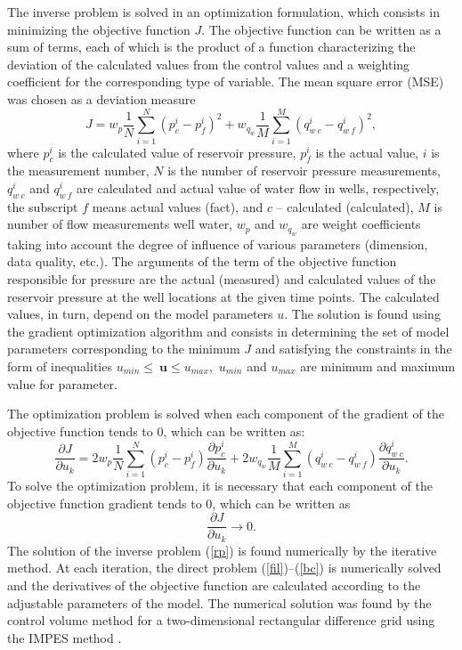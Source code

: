 \documentclass{article}
\begin{document}
The inverse problem is solved in an optimization
formulation, which consists in minimizing the objective function $J$.
The objective function can be written as a sum of terms, each of which
is the product of a function characterizing the deviation of the
calculated values from the control values and a weighting
coefficient for the corresponding type of variable. The mean square
error (MSE) was chosen as a deviation measure
\begin{equation} \label{mse}
	J=w_p\frac{1}{N}\sum_{i=1}^N{\left(p_c^i-p_f^i\right)^2}+
	w_{q_w}\frac{1}{M}\sum_{i=1}^M{\left(q_{w\:c}^i-q_{w\:f}^i\right)^2},
\end{equation}
where $p_c^i$ is the calculated value of reservoir pressure, $p_f^i$
is the actual value, $i$ is the measurement number, $N$ is the
number of reservoir pressure measurements, $q_{w\:c}^i$ and $
q_{w\:f}^i$ are calculated and actual value of water flow in wells,
respectively, the subscript $f$ means actual values (fact), and $c$
-- calculated (calculated), $M$ is number of flow measurements well
water, $w_p$ and $w_{q_w}$ are weight coefficients taking into
account the degree of influence of various parameters (dimension,
data quality, etc.). The arguments of the term of the objective
function responsible for pressure are the actual (measured) and
calculated values of the reservoir pressure at the well locations at
the given time points. The calculated values, in turn, depend on the
model parameters $u$. The solution is found using the gradient
optimization algorithm and consists in determining the set of model
parameters corresponding to the minimum $J$ and satisfying the
constraints in the form of inequalities
$
u_{min}\leq\ \boldsymbol{u}\leq u_{max},
$
$u_{min}$ and $u_{max}$ are minimum and maximum value for 
parameter.

The optimization problem is solved when each component of the gradient of the objective function tends to 0, which can be written as:
\begin{equation}\label{grad}
	\frac{\partial J}{\partial u_k} = 2w_p\frac{1}{N}\sum_{i=1}^N
	({p_c^i-p_f^i}) \frac{\partial p_c^i}{\partial
		u_k}+2w_{q_w}\frac{1}{M}\sum_{i=1}^M{\left(q_{w\:c}^i-q_{w\:f}^i\right)}\frac{\partial
		q_{w\:c}^i}{\partial u_k}.
\end{equation}
To solve the optimization problem, it is necessary that each
component  of the objective function gradient tends to 0, which can
be written as
\begin{equation} \label{rp}
	\frac{\partial J}{\partial u_k} \rightarrow 0.
\end{equation}
The solution of the inverse problem (\ref{rp}) is found  numerically
by the iterative method. At each iteration, the direct problem
(\ref{fil})--(\ref{bc}) is numerically solved and the derivatives of
the objective function are calculated according to the adjustable
parameters of the \cite{opt} model. The numerical solution was found
by the control volume method for a two-dimensional rectangular
difference grid using the IMPES method \cite{azi}.
\end{document}
